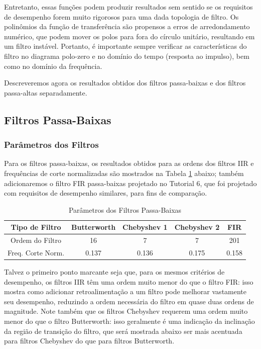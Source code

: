 \documentclass[a4paper,twoside,12pt]{article}
\begin{document}
	Entretanto, essas funções podem produzir resultados sem sentido se os requisitos de desempenho forem muito rigorosos para uma dada topologia de filtro. Os polinômios da função de transferência são propensos a erros de arredondamento numérico, que podem mover os polos para fora do círculo unitário, resultando em um filtro instável. Portanto, é importante sempre verificar as características do filtro no diagrama polo-zero e no domínio do tempo (resposta ao impulso), bem como no domínio da frequência.
	
	Descreveremos agora os resultados obtidos dos filtros passa-baixas e dos filtros passa-altas separadamente.
	
	\subsection{Filtros Passa-Baixas}
	
	\subsubsection{Parâmetros dos Filtros}
	
	Para os filtros passa-baixas, os resultados obtidos para as ordens dos filtros IIR e frequências de corte normalizadas são mostrados na Tabela \ref{table:IIR_pb_parametros} abaixo; também adicionaremos o filtro FIR passa-baixas projetado no Tutorial 6, que foi projetado com requisitos de desempenho similares, para fins de comparação.
	
	\begin{table}[h!]
		\centering
		\caption{Parâmetros dos Filtros Passa-Baixas}
		\begin{tabular}{c|ccc||c}
			\hline
			Tipo de Filtro			& Butterworth	& Chebyshev 1	& Chebyshev 2	& FIR \\
			\hline
			Ordem do Filtro			& 16			& 7				& 7				& 201 \\
			Freq. Corte Norm.		& 0.137			& 0.136			& 0.175			& 0.158 \\
			\hline
		\end{tabular}
		\label{table:IIR_pb_parametros}
	\end{table}
	
	Talvez o primeiro ponto marcante seja que, para os mesmos critérios de desempenho, os filtros IIR têm uma ordem muito menor do que o filtro FIR: isso mostra como adicionar retroalimentação a um filtro pode melhorar vastamente seu desempenho, reduzindo a ordem necessária do filtro em quase duas ordens de magnitude. Note também que os filtros Chebyshev requerem uma ordem muito menor do que o filtro Butterworth: isso geralmente é uma indicação da inclinação da região de transição do filtro, que será mostrada abaixo ser mais acentuada para filtros Chebyshev do que para filtros Butterworth.
	
\end{document}
